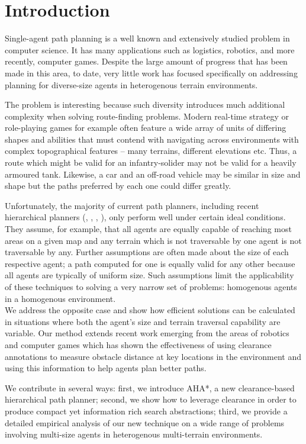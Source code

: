 \section{Introduction}
Single-agent path planning is a well known and extensively studied problem in computer science.
It has many applications such as logistics, robotics, and more recently, computer games. 
Despite the large amount of progress that has been made in this area, to date, very little work has focused specifically on addressing planning for diverse-size agents in heterogenous terrain environments. 
\par \indent
The problem is interesting because such diversity introduces much additional complexity when solving route-finding problems.
Modern real-time strategy or role-playing games for example often feature a wide array of units of differing shapes and abilities that must contend with navigating across environments with complex topographical features -- many terrains, different elevations etc. 
Thus, a route which might be valid for an infantry-solider may not be valid for a heavily armoured tank. 
Likewise, a car and an off-road vehicle may be similar in size and shape but the paths preferred by each one could differ greatly. 
\par \indent
Unfortunately, the majority of current path planners, including recent hierarchical planners (\cite{botea04}, \cite{sturtevant05}, \cite{demyen07}, \cite{geraerts07}), only perform well under certain ideal conditions. 
They assume, for example, that all agents are equally capable of reaching most areas on a given map and any terrain which is not traversable by one agent is not traversable by any. 
Further assumptions are often made about the size of each respective agent; a path computed for one is equally valid for any other because all agents are typically of uniform size. 
Such assumptions limit the applicability of these techniques to solving a very narrow set of problems: homogenous agents in a homogenous environment. \\
We address the opposite case and show how efficient solutions can be calculated in situations where both the agent's size and terrain traversal capability are variable. 
Our method extends recent work emerging from the areas of robotics and computer games which has shown the effectiveness of using clearance annotations to measure obstacle distance at key locations in the environment and using this information to help agents plan better paths. 
\par \indent
We contribute in several ways: first, we introduce AHA*, a new clearance-based hierarchical path planner; second, we show how to leverage clearance in order to produce compact yet information rich search abstractions; third, we provide a detailed empirical analysis of our new technique on a wide range of problems involving multi-size agents in heterogenous multi-terrain environments.
